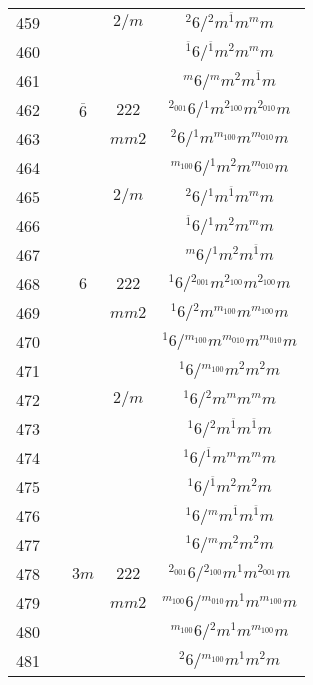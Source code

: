 \begin{longtable}{ccccc}
  459 &  &  & $2/m$ & ${}^{2} 6  / {}^{2} m {}^{\overline{1}} m {}^{m} m $\\
  460 &  &  &  & ${}^{\overline{1}} 6  / {}^{\overline{1}} m {}^{2} m {}^{m} m $\\
  461 &  &  &  & ${}^{m} 6  / {}^{m} m {}^{2} m {}^{\overline{1}} m $\\
  462 &  & $\overline{6}$ & $222$ & ${}^{2_{001}} 6  / {}^{1} m {}^{2_{100}} m {}^{2_{010}} m $\\
  463 &  &  & $mm2$ & ${}^{2} 6  / {}^{1} m {}^{m_{100}} m {}^{m_{010}} m $\\
  464 &  &  &  & ${}^{m_{100}} 6  / {}^{1} m {}^{2} m {}^{m_{010}} m $\\
  465 &  &  & $2/m$ & ${}^{2} 6  / {}^{1} m {}^{\overline{1}} m {}^{m} m $\\
  466 &  &  &  & ${}^{\overline{1}} 6  / {}^{1} m {}^{2} m {}^{m} m $\\
  467 &  &  &  & ${}^{m} 6  / {}^{1} m {}^{2} m {}^{\overline{1}} m $\\
  468 &  & $6$ & $222$ & ${}^{1} 6  / {}^{2_{001}} m {}^{2_{100}} m {}^{2_{100}} m $\\
  469 &  &  & $mm2$ & ${}^{1} 6  / {}^{2} m {}^{m_{100}} m {}^{m_{100}} m $\\
  470 &  &  &  & ${}^{1} 6  / {}^{m_{100}} m {}^{m_{010}} m {}^{m_{010}} m $\\
  471 &  &  &  & ${}^{1} 6  / {}^{m_{100}} m {}^{2} m {}^{2} m $\\
  472 &  &  & $2/m$ & ${}^{1} 6  / {}^{2} m {}^{m} m {}^{m} m $\\
  473 &  &  &  & ${}^{1} 6  / {}^{2} m {}^{\overline{1}} m {}^{\overline{1}} m $\\
  474 &  &  &  & ${}^{1} 6  / {}^{\overline{1}} m {}^{m} m {}^{m} m $\\
  475 &  &  &  & ${}^{1} 6  / {}^{\overline{1}} m {}^{2} m {}^{2} m $\\
  476 &  &  &  & ${}^{1} 6  / {}^{m} m {}^{\overline{1}} m {}^{\overline{1}} m $\\
  477 &  &  &  & ${}^{1} 6  / {}^{m} m {}^{2} m {}^{2} m $\\
  478 &  & $3m$ & $222$ & ${}^{2_{001}} 6  / {}^{2_{100}} m {}^{1} m {}^{2_{001}} m $\\
  479 &  &  & $mm2$ & ${}^{m_{100}} 6  / {}^{m_{010}} m {}^{1} m {}^{m_{100}} m $\\
  480 &  &  &  & ${}^{m_{100}} 6  / {}^{2} m {}^{1} m {}^{m_{100}} m $\\
  481 &  &  &  & ${}^{2} 6  / {}^{m_{100}} m {}^{1} m {}^{2} m $\\

\end{longtable}
